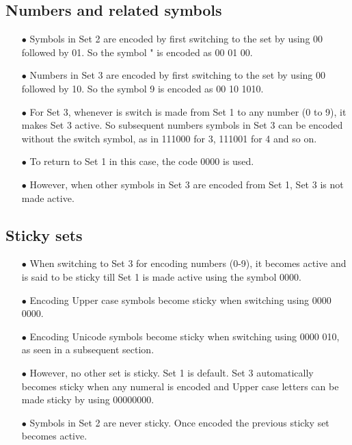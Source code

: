 \documentclass[]{article}
\begin{document}
\subsection{Numbers and related symbols}
\begin{itemize}
	\item[$\bullet$] Symbols in Set 2 are encoded by first switching to the set by using 00 followed by 01. So the symbol " is encoded as 00 01 00.
	\item[$\bullet$] Numbers in Set 3 are encoded by first switching to the set by using 00 followed by 10. So the symbol 9 is encoded as 00 10 1010.
	\item[$\bullet$] For Set 3, whenever is switch is made from Set 1 to any number (0 to 9), it makes Set 3 active. So subsequent numbers symbols in Set 3 can be encoded without the switch symbol, as in 111000 for 3, 111001 for 4 and so on.
	\item[$\bullet$] To return to Set 1 in this case, the code 0000 is used.
	\item[$\bullet$] However, when other symbols in Set 3 are encoded from Set 1, Set 3 is not made active.
\end{itemize}

\subsection{Sticky sets}
\begin{itemize}
	\item[$\bullet$] When switching to Set 3 for encoding numbers (0-9), it becomes active and is said to be sticky till Set 1 is made active using the symbol 0000.
	\item[$\bullet$] Encoding Upper case symbols become sticky when switching using 0000 0000.
	\item[$\bullet$] Encoding Unicode symbols become sticky when switching using 0000 010, as seen in a subsequent section.
	\item[$\bullet$] However, no other set is sticky. Set 1 is default. Set 3 automatically becomes sticky when any numeral is encoded and Upper case letters can be made sticky by using 00000000.
	\item[$\bullet$] Symbols in Set 2 are never sticky. Once encoded the previous sticky set becomes active.
\end{itemize}
\end{document}
